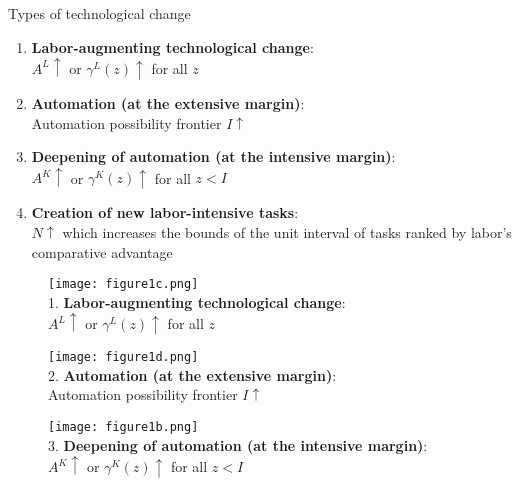 \documentclass[notes=show]{beamer}
\begin{document}
\begin{frame}{Types of technological change}
\begin{enumerate}
\item \textbf{Labor-augmenting technological change}: \\
$A^{L} \uparrow$ or $\gamma^{L}(z) \uparrow$ for all $z$\medskip
\item \textbf{Automation (at the extensive margin)}: \\
Automation possibility frontier $I \uparrow $ \medskip
\item \textbf{Deepening of automation (at the intensive margin)}: \\
$A^{K} \uparrow$ or $\gamma^{K}(z) \uparrow$ for all $z < I$ \medskip
\item \textbf{Creation of new labor-intensive tasks}: \\
$N \uparrow $ which increases the bounds of the unit interval of tasks ranked by labor's comparative advantage
\end{enumerate}
\end{frame}

\newpage
\begin{center}
\begin{figure}
\texttt{[image: figure1c.png]}
\\ 1. \textbf{Labor-augmenting technological change}: \\
$A^{L} \uparrow$ or $\gamma^{L}(z) \uparrow$ for all $z$
\end{figure} 
\end{center}
\newpage

\newpage
\begin{center}
\begin{figure}
\texttt{[image: figure1d.png]}
\\ 2. \textbf{Automation (at the extensive margin)}: \\
Automation possibility frontier $I \uparrow $
\end{figure} 
\end{center}
\newpage

\newpage
\begin{center}
\begin{figure}
\texttt{[image: figure1b.png]}
\\ 3. \textbf{Deepening of automation (at the intensive margin)}: \\
$A^{K} \uparrow$ or $\gamma^{K}(z) \uparrow$ for all $z < I$
\end{figure} 
\end{center}
\newpage
\end{document}
